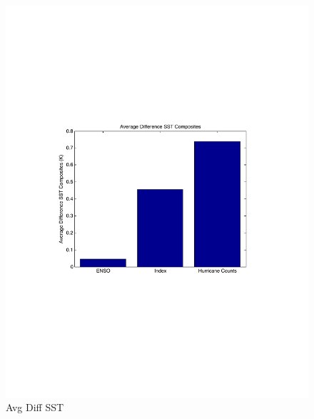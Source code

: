 \documentclass[a4paper,10pt]{article}
\begin{document}
\begin{figure}[ht]
\begin{minipage}[b]{0.6\linewidth}
\includegraphics[width=\textwidth]{figs/sensitivityResults/compositeBarGraphs/sstBarGraph.pdf}
\caption{Avg Diff SST}
\label{fig:figure32}
\end{minipage}
\end{figure}

\end{document}
